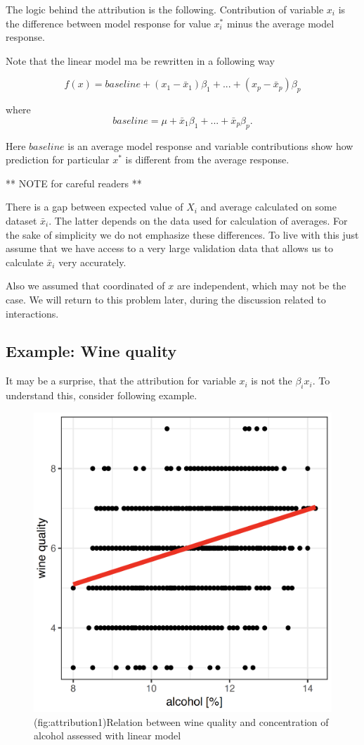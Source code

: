 \documentclass[]{krantz}
\theoremstyle{definition}
\theoremstyle{definition}
\theoremstyle{definition}
\theoremstyle{remark}
\begin{document}
The logic behind the attribution is the following. Contribution of
variable \(x_i\) is the difference between model response for value
\(x_i^*\) minus the average model response.

Note that the linear model ma be rewritten in a following way

\[
f(x) = baseline + (x_1 - \bar x_1) \beta_1 + ... + (x_p - \bar x_p) \beta_p
\]

where \[
baseline = \mu + \bar x_1 \beta_1 + ... + \bar x_p \beta_p.
\]

Here \(baseline\) is an average model response and variable
contributions show how prediction for particular \(x^*\) is different
from the average response.

** NOTE for careful readers **

There is a gap between expected value of \(X_i\) and average calculated
on some dataset \(\bar x_i\). The latter depends on the data used for
calculation of averages. For the sake of simplicity we do not emphasize
these differences. To live with this just assume that we have access to
a very large validation data that allows us to calculate \(\bar x_i\)
very accurately.

Also we assumed that coordinated of \(x\) are independent, which may not
be the case. We will return to this problem later, during the discussion
related to interactions.

\hypertarget{example-wine-quality}{%
\subsection{Example: Wine quality}\label{example-wine-quality}}

It may be a surprise, that the attribution for variable \(x_i\) is not
the \(\beta_i x_i\). To understand this, consider following example.

\begin{figure}

{\centering \includegraphics[width=0.5\linewidth]{figure/attribution_1} 

}

\caption{(fig:attribution1)Relation between wine quality and concentration of alcohol assessed with linear model}\label{fig:attribution1}
\end{figure}
\end{document}
